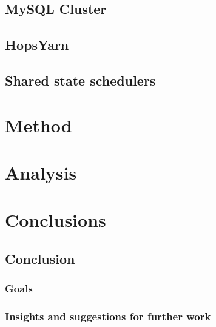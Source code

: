\documentclass[12pt,a4paper,twoside,openright]{book}
\begin{document}
\section{MySQL Cluster}
\label{sec:ndb}


\section{HopsYarn}
\label{sec:hopsyarn}


\section{Shared state schedulers}
\label{sec:shared_state_sch}


\chapter{Method}
\label{chap:method}


\chapter{Analysis}
\label{chap:analysis}


\chapter{Conclusions}
\label{chap:conclusion}

\section{Conclusion}
\label{sec:conclusion}


\subsection{Goals}
\label{ssec:goals}


\subsection{Insights and suggestions for further work}
\label{ssec:insights-and-suggestions}

\end{document}
